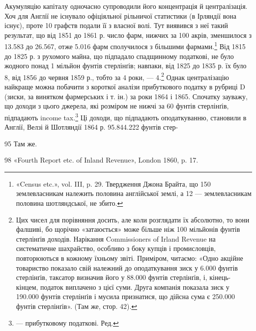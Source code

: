 Акумуляцію капіталу одночасно супроводили його концентрація
й централізація. Хоч для Англії не існувало офіціяльної
рільничої статистики (в Ірляндії вона існує), проте 10 графств подали
її з власної волі. Тут виявився з неї такий результат, що від
1851 до 1861 р. число фарм, нижчих за 100 акрів, зменшилося з
13.583 до 26.567, отже 5.016 фарм сполучилося з більшими фармами.\footnote{
«Census etc.», vol. III, p. 29. Твердження Джона Брайта, що 150
землевласникам належить половина англійської землі, а 12 — землевласникам
половина шотляндської, не збито.
}  Від 1815 до 1825 р. з рухомого майна, що підпадало спадщинному
податкові, не було жодного понад 1 мільйон фунтів стерлінґів;
навпаки, від 1825 до 1835 р. їх було 8, від 1856 до червня
1859 р., тобто за 4 роки, — 4.\footnote{
Цих чисел для порівняння досить, але коли розглядати їх абсолютно,
то вони фалшиві, бо щорічно «затаюється» може більше ніж
100 мільйонів фунтів стерлінґів доходів. Нарікання Commissioners of Irland
Revenue на систематичне шахрайство, особливо з боку купців і промисловців,
повторюються в кожному їхньому звіті. Приміром, читаємо:
«Одно акційне товариство показало свій належний до оподаткування зиск
у 6.000 фунтів стерлінґів, таксатор визначив його у 88.000 фунтів стерлінґів,
і, кінець-кінцем, податок виплачено з цієї суми. Друга компанія
показала зиск у 190.000 фунтів стерлінґів і мусила признатися, що
дійсна сума є 250.000 фунтів стерлінґів». (Там же, стор. 42).
} Однак централізацію найкраще
можна побачити з короткої аналізи прибуткового податку
в рубриці D (зиски, за винятком фармерських і т. ін.) за роки
1864 і 1865. Спочатку зауважу, що доходи з цього джерела,
які розміром не нижчі за 60 фунтів стерлінґів, підпадають
income tax.\footnote*{
— прибутковому податкові. Ред.
} Ці доходи, що підпадають оподаткуванню, становили
в Англії, Велзі й Шотляндії 1864 р. 95.844.222 фунтів стер-

95    Там же.

98 «Fourth Report etc. of Inland Revenue», London 1860, p. 17.